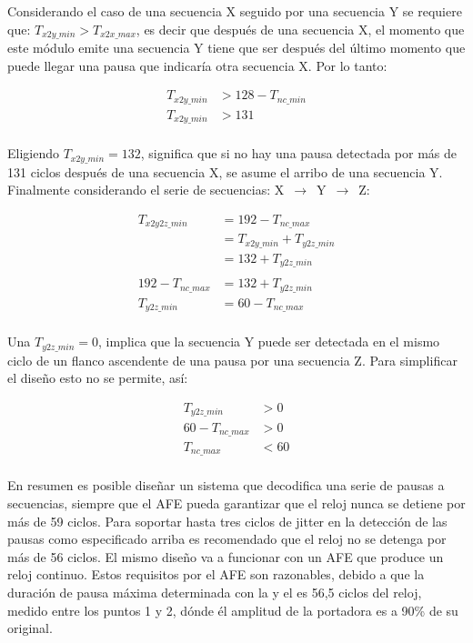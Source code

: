 \documentclass[a4paper, twoside, 11pt]{report}
\begin{document}
Considerando el caso de una secuencia X seguido por una secuencia Y se requiere que: $T_{x2y\_min} > T_{x2x\_max}$, es decir que después de una secuencia X, el momento que este módulo emite una secuencia Y tiene que ser después del último momento que puede llegar una pausa que indicaría otra secuencia X. Por lo tanto:

\begin{align*}
    T_{x2y\_min} &> 128 - T_{nc\_min} \\
    T_{x2y\_min} &> 131 \\
\end{align*}

Eligiendo $T_{x2y\_min} = 132$, significa que si no hay una pausa detectada por más de 131 ciclos después de una secuencia X, se asume el arribo de una secuencia Y. Finalmente considerando el serie de secuencias: X~$\rightarrow$~Y~$\rightarrow$~Z:

\begin{align*}
    T_{x2y2z\_min} &= 192 - T_{nc\_max} \\
               &= T_{x2y\_min} + T_{y2z\_min} \\
               &= 132 + T_{y2z\_min} \\
    \\
    192 - T_{nc\_max} &= 132 + T_{y2z\_min} \\
    T_{y2z\_min} &= 60 - T_{nc\_max} \\
\end{align*}

Una $T_{y2z\_min} = 0$, implica que la secuencia Y puede ser detectada en el mismo ciclo de un flanco ascendente de una pausa por una secuencia Z. Para simplificar el diseño esto no se permite, así:

\begin{align*}
    T_{y2z\_min} &> 0 \\
    60 - T_{nc\_max} &> 0 \\
    T_{nc\_max} &< 60 \\
\end{align*}

En resumen es posible diseñar un sistema que decodifica una serie de pausas a secuencias, siempre que el AFE pueda garantizar que el reloj nunca se detiene por más de 59 ciclos. Para soportar hasta tres ciclos de jitter en la detección de las pausas como especificado arriba es recomendado que el reloj no se detenga por más de 56 ciclos. El mismo diseño va a funcionar con un AFE que produce un reloj continuo. Estos requisitos por el AFE son razonables, debido a que la duración de pausa máxima determinada con la  y el  es 56,5 ciclos del reloj, medido entre los puntos 1 y 2, dónde él amplitud de la portadora es a 90\% de su original.
\end{document}
